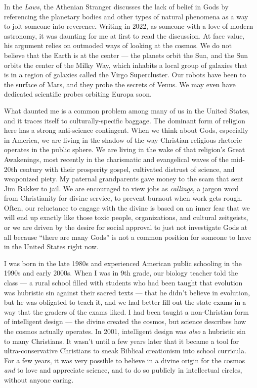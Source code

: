 \documentclass[
]{book}
\begin{document}
In the \emph{Laws}, the Athenian Stranger discusses the lack of belief in Gods by referencing the planetary bodies and other types of natural phenomena as a way to jolt someone into reverence. Writing in 2022, as someone with a love of modern astronomy, it was daunting for me at first to read the discussion. At face value, his argument relies on outmoded ways of looking at the cosmos. We do not believe that the Earth is at the center --- the planets orbit the Sun, and the Sun orbits the center of the Milky Way, which inhabits a local group of galaxies that is in a region of galaxies called the Virgo Supercluster. Our robots have been to the surface of Mars, and they probe the secrets of Venus. We may even have dedicated scientific probes orbiting Europa soon.

What daunted me is a common problem among many of us in the United States, and it traces itself to culturally-specific baggage. The dominant form of religion here has a strong anti-science contingent. When we think about Gods, especially in America, we are living in the shadow of the way Christian religious rhetoric operates in the public sphere. We are living in the wake of that religion's Great Awakenings, most recently in the charismatic and evangelical waves of the mid-20th century with their prosperity gospel, cultivated distrust of science, and weaponized piety. My paternal grandparents gave money to the scam that sent Jim Bakker to jail. We are encouraged to view jobs as \emph{callings}, a jargon word from Christianity for divine service, to prevent burnout when work gets rough. Often, our reluctance to engage with the divine is based on an inner fear that we will end up exactly like those toxic people, organizations, and cultural zeitgeists, or we are driven by the desire for social approval to just not investigate Gods at all because ``there are many Gods'' is not a common position for someone to have in the United States right now.

I was born in the late 1980s and experienced American public schooling in the 1990s and early 2000s. When I was in 9th grade, our biology teacher told the class --- a rural school filled with students who had been taught that evolution was hubristic sin against their sacred texts --- that he didn't believe in evolution, but he was obligated to teach it, and we had better fill out the state exams in a way that the graders of the exams liked. I had been taught a non-Christian form of intelligent design --- the divine created the cosmos, but science describes how the cosmos actually operates. In 2001, intelligent design was \emph{also} a hubristic sin to many Christians. It wasn't until a few years later that it became a tool for ultra-conservative Christians to sneak Biblical creationism into school curricula. For a few years, it was very possible to believe in a divine origin for the cosmos \emph{and} to love and appreciate science, and to do so publicly in intellectual circles, without anyone caring.
\end{document}
